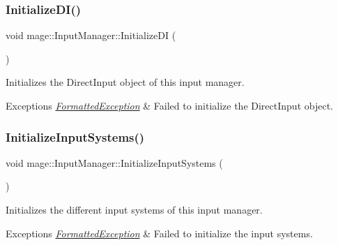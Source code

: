 \subsubsection{\texorpdfstring{Initialize\+D\+I()}{InitializeDI()}}
{\footnotesize\ttfamily void mage\+::\+Input\+Manager\+::\+Initialize\+DI (\begin{DoxyParamCaption}{ }\end{DoxyParamCaption})\hspace{0.3cm}{\ttfamily [private]}}

Initializes the Direct\+Input object of this input manager.


\begin{DoxyExceptions}{Exceptions}
{\em \hyperlink{structmage_1_1_formatted_exception}{Formatted\+Exception}} & Failed to initialize the Direct\+Input object. \\
\hline
\end{DoxyExceptions}
\hypertarget{classmage_1_1_input_manager_a73ec320ef9f3809f092b98da50f99840}{}\label{classmage_1_1_input_manager_a73ec320ef9f3809f092b98da50f99840} 
\subsubsection{\texorpdfstring{Initialize\+Input\+Systems()}{InitializeInputSystems()}}
{\footnotesize\ttfamily void mage\+::\+Input\+Manager\+::\+Initialize\+Input\+Systems (\begin{DoxyParamCaption}{ }\end{DoxyParamCaption})\hspace{0.3cm}{\ttfamily [private]}}

Initializes the different input systems of this input manager.


\begin{DoxyExceptions}{Exceptions}
{\em \hyperlink{structmage_1_1_formatted_exception}{Formatted\+Exception}} & Failed to initialize the input systems. \\
\hline
\end{DoxyExceptions}
\hypertarget{classmage_1_1_input_manager_ad9caa8b7e99a69b774887f342bd5dda0}{}\label{classmage_1_1_input_manager_ad9caa8b7e99a69b774887f342bd5dda0} 
